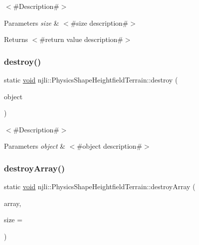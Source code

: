 $<$\#\+Description\#$>$


\begin{DoxyParams}{Parameters}
{\em size} & $<$\#size description\#$>$\\
\hline
\end{DoxyParams}
\begin{DoxyReturn}{Returns}
$<$\#return value description\#$>$ 
\end{DoxyReturn}
\mbox{\label{classnjli_1_1_physics_shape_heightfield_terrain_ae24eb0c7625122d6aa27eafff6b615ab}} 
\subsubsection{\texorpdfstring{destroy()}{destroy()}}
{\footnotesize\ttfamily static \mbox{\hyperlink{_thread_8h_af1e856da2e658414cb2456cb6f7ebc66}{void}} njli\+::\+Physics\+Shape\+Heightfield\+Terrain\+::destroy (\begin{DoxyParamCaption}\item[{\mbox{\hyperlink{classnjli_1_1_physics_shape_heightfield_terrain}{Physics\+Shape\+Heightfield\+Terrain}} $\ast$}]{object }\end{DoxyParamCaption})\hspace{0.3cm}{\ttfamily [static]}}

$<$\#\+Description\#$>$


\begin{DoxyParams}{Parameters}
{\em object} & $<$\#object description\#$>$ \\
\hline
\end{DoxyParams}
\mbox{\label{classnjli_1_1_physics_shape_heightfield_terrain_a57337f8e719788b8f00862a6158f41f6}} 
\subsubsection{\texorpdfstring{destroy\+Array()}{destroyArray()}}
{\footnotesize\ttfamily static \mbox{\hyperlink{_thread_8h_af1e856da2e658414cb2456cb6f7ebc66}{void}} njli\+::\+Physics\+Shape\+Heightfield\+Terrain\+::destroy\+Array (\begin{DoxyParamCaption}\item[{\mbox{\hyperlink{classnjli_1_1_physics_shape_heightfield_terrain}{Physics\+Shape\+Heightfield\+Terrain}} $\ast$$\ast$}]{array,  }\item[{const \mbox{\hyperlink{_util_8h_a10e94b422ef0c20dcdec20d31a1f5049}{u32}}}]{size = {} }\end{DoxyParamCaption})\hspace{0.3cm}{\ttfamily [static]}}

